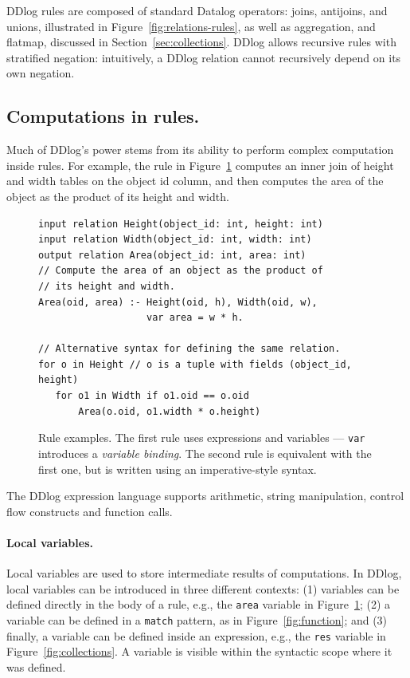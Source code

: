 DDlog rules are composed of standard Datalog operators: joins, antijoins, and
unions, illustrated in Figure~\ref{fig:relations-rules}, as
well as aggregation, and flatmap, discussed in Section~\ref{sec:collections}.
DDlog allows recursive rules with stratified negation: intuitively, a DDlog
relation cannot recursively depend on its own negation.

\subsection{Computations in rules.}

Much of DDlog's power stems from its ability to perform complex
computation inside rules.  For example, the rule in
Figure~\ref{fig:area} computes an inner join of height and width
tables on the object id column, and then computes the area of the
object as the product of its height and width.

\begin{figure}[t]
  \footnotesize
  \begin{lstlisting}[language=ddlog]
input relation Height(object_id: int, height: int)
input relation Width(object_id: int, width: int)
output relation Area(object_id: int, area: int)
// Compute the area of an object as the product of
// its height and width.
Area(oid, area) :- Height(oid, h), Width(oid, w),
                   var area = w * h.

// Alternative syntax for defining the same relation.
for o in Height // o is a tuple with fields (object_id, height)
   for o1 in Width if o1.oid == o.oid
       Area(o.oid, o1.width * o.height)
  \end{lstlisting}
  \caption{Rule examples.  The first rule uses expressions and
    variables --- \texttt{var} introduces a \emph{variable binding}.
    The second rule is equivalent with the first one, but is written
    using an imperative-style syntax.\label{fig:area}}
\end{figure}

The DDlog expression language supports arithmetic, string
manipulation, control flow constructs and function calls.

\paragraph{Local variables.}
Local variables are used to store intermediate results of
computations.  In DDlog, local variables can be introduced in three
different contexts: (1) variables can be defined directly in the body
of a rule, e.g., the \texttt{area} variable in Figure~\ref{fig:area};
(2) a variable can be defined in a \texttt{match} pattern, as in
Figure~\ref{fig:function}; and (3) finally, a variable can be defined
inside an expression, e.g., the \texttt{res} variable in
Figure~\ref{fig:collections}.  A variable is visible within the
syntactic scope where it was defined.

